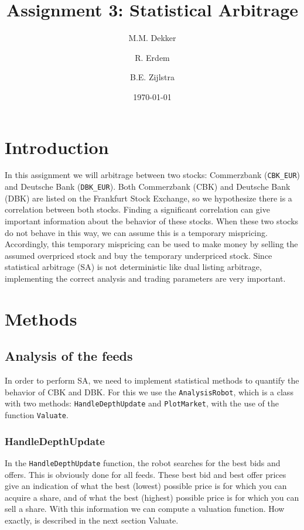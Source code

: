 \documentclass[a4paper]{article}
\title{Assignment 3: Statistical Arbitrage}
\author{M.M. Dekker\\
\and 
R. Erdem\\
\and
B.E. Zijlstra\\}
\date{\today}
\begin{document}
\maketitle

\section{Introduction}
In this assignment we will arbitrage between two stocks: Commerzbank (\texttt{CBK\_EUR}) and Deutsche Bank (\texttt{DBK\_EUR}). Both Commerzbank (CBK) and Deutsche Bank (DBK) are listed on the Frankfurt Stock Exchange, so we hypothesize there is a correlation between both stocks. Finding a significant correlation can give important information about the behavior of these stocks. When these two stocks do not behave in this way, we can assume this is a temporary mispricing. Accordingly, this temporary mispricing can be used to make money by selling the assumed overpriced stock and buy the temporary underpriced stock. Since statistical arbitrage (SA) is not deterministic like dual listing arbitrage, implementing the correct analysis and trading parameters are very important. 

\section{Methods}

\subsection{Analysis of the feeds}
In order to perform SA, we need to implement statistical methods to quantify the behavior of CBK and DBK. For this we use the \texttt{AnalysisRobot}, which is a class with two methods: \texttt{HandleDepthUpdate} and \texttt{PlotMarket}, with the use of the function \texttt{Valuate}.

\subsubsection{HandleDepthUpdate}
In the \texttt{HandleDepthUpdate} function, the robot searches for the best bids and offers. This is obviously done for all feeds. These best bid and best offer prices give an indication of what the best (lowest) possible price is for which you can acquire a share, and of what the best (highest) possible price is for which you can sell a share. With this information we can compute a valuation function. How exactly, is described in the next section Valuate.
\end{document}
